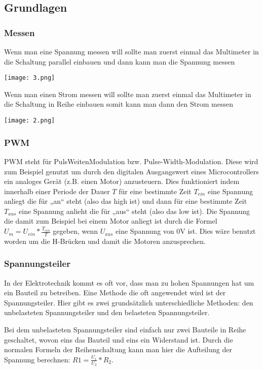 \documentclass[notitlepage]{report}
\begin{document}
\subsection{Grundlagen}

\subsubsection{Messen}

Wenn man eine Spannung messen will sollte man zuerst einmal das Multimeter in die Schaltung parallel einbauen und dann kann man die Spannung messen

\texttt{[image: 3.png]}

Wenn man einen Strom messen will sollte man zuerst einmal das Multimeter in die Schaltung in Reihe einbauen somit kann man dann den Strom messen

\texttt{[image: 2.png]}

\subsubsection{PWM}

PWM steht f\"{u}r PulsWeitenModulation bzw. Pulse-Width-Modulation. Diese wird zum Beispiel genutzt um durch den digitalen Ausgangswert eines Microcontrollers ein analoges Ger\"{a}t (z.B. einen Motor) anzusteuern. Dies funktioniert indem innerhalb einer Periode der Dauer $T$ f\"{u}r eine bestimmte Zeit $T_{ein}$ eine Spannung anliegt die f\"{u}r „an“ steht (also das high ist) und dann f\"{u}r eine bestimmte Zeit $T_{aus}$ eine Spannung anlieht die f\"{u}r „aus“ steht (also das low ist). Die Spannung die damit zum Beispiel bei einem Motor anliegt ist durch die Formel $U_m = U_{ein} * \frac{T_{ein}}{T}$ gegeben, wenn $U_{aus}$ eine Spannung von 0V ist. Dies w\"{a}re benutzt worden um die H-Br\"{u}cken und damit die Motoren anzusprechen.

\subsubsection{Spannungsteiler}

In der Elektrotechnik kommt es oft vor, dass man zu hohen Spannungen hat um ein Bauteil zu betreiben. Eine Methode die oft angewendet wird ist der Spannungsteiler. Hier gibt es zwei grunds\"{a}tzlich unterschiedliche Methoden: den unbelasteten Spannungsteiler und den belasteten Spannungsteiler. 

Bei dem unbelasteten Spannungsteiler sind einfach nur zwei Bauteile in Reihe geschaltet, wovon eins das Bauteil und eins ein Widerstand ist. Durch die normalen Formeln der Reihenschaltung kann man hier die Aufteilung der Spannung berechnen: $R1 = \frac{U_1}{U_2} * R_2$. 
\end{document}
